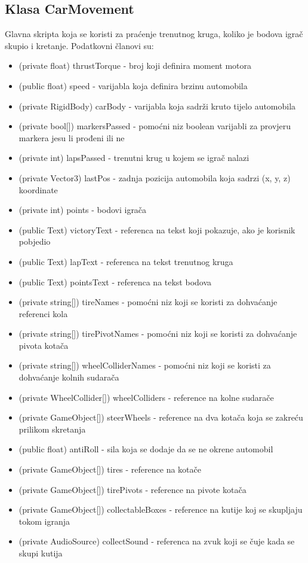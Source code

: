\subsection{Klasa CarMovement}
Glavna skripta koja se koristi za praćenje trenutnog kruga, koliko je bodova igrač skupio i kretanje. Podatkovni članovi su:
\begin{itemize}
	\item (private float) thrustTorque - broj koji definira moment motora
	\item (public float) speed - varijabla koja definira brzinu automobila
	\item (private RigidBody) carBody - varijabla koja sadrži kruto tijelo automobila
	\item (private bool[]) markersPassed - pomoćni niz boolean varijabli za provjeru markera jesu li prođeni ili ne
	\item (private int) lapsPassed - trenutni krug u kojem se igrač nalazi
	\item (private Vector3) lastPos - zadnja pozicija automobila koja sadrzi (x, y, z) koordinate
	\item (private int) points - bodovi igrača
	\item (public Text) victoryText - referenca na tekst koji pokazuje, ako je korisnik pobjedio
	\item (public Text) lapText - referenca na tekst trenutnog kruga
	\item (public Text) pointsText - referenca na tekst bodova 
	\item (private string[]) tireNames - pomoćni niz koji se koristi za dohvaćanje referenci kola
	\item (private string[]) tirePivotNames - pomoćni niz koji se koristi za dohvaćanje pivota kotača
	\item (private string[]) wheelColliderNames - pomoćni niz koji se koristi za dohvaćanje kolnih sudarača
	\item (private WheelCollider[]) wheelColliders - reference na kolne sudarače
	\item (private GameObject[]) steerWheels - reference na dva kotača koja se zakreću prilikom skretanja
	\item (public float) antiRoll - sila koja se dodaje da se ne okrene automobil
	\item (private GameObject[]) tires - reference na kotače
	\item (private GameObject[]) tirePivots - reference na pivote kotača
	\item (private GameObject[]) collectableBoxes - reference na kutije koj se skupljaju tokom igranja
	\item (private AudioSource) collectSound - referenca na zvuk koji se čuje kada se skupi kutija
\end{itemize}